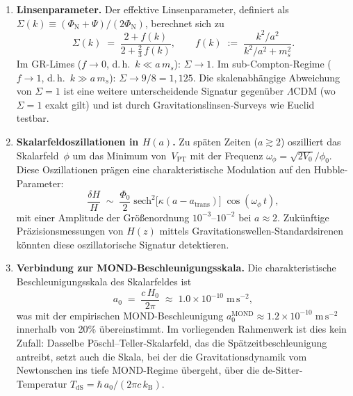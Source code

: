 \documentclass[12pt,a4paper]{article}
\theoremstyle{definition}
\theoremstyle{plain}
\theoremstyle{remark}
\begin{document}
\begin{enumerate}
  \item \textbf{Linsenparameter.}\;
        Der effektive Linsenparameter, definiert als
        $\Sigma(k) \equiv (\Phi_{\mathrm{N}} + \Psi)/
        (2\Phi_{\mathrm{N}})$, berechnet sich zu
        \begin{equation}\label{eq:Sigma}
          \Sigma(k) \;=\;
          \frac{2 + f(k)}{2 + \tfrac{2}{3}\,f(k)},
          \qquad
          f(k) \;:=\;
          \frac{k^{2}/a^{2}}{k^{2}/a^{2} + m_{s}^{2}}.
        \end{equation}
        Im GR-Limes ($f \to 0$, d.\,h.\ $k \ll a\,m_s$):
        $\Sigma \to 1$.  Im sub-Compton-Regime ($f \to 1$, d.\,h.\
        $k \gg a\,m_s$): $\Sigma \to 9/8 = 1{,}125$.  Die
        skalenabh\"angige Abweichung von $\Sigma = 1$ ist eine
        weitere unterscheidende Signatur gegen\"uber $\Lambda$CDM
        (wo $\Sigma = 1$ exakt gilt) und ist durch
        Gravitationslinsen-Surveys wie
        Euclid~\cite{SotiriouFaraoni2010} testbar.

  \item \textbf{Skalarfeldoszillationen in $H(a)$.}\;
        Zu sp\"aten Zeiten ($a \gtrsim 2$) oszilliert das
        Skalarfeld~$\phi$ um das Minimum von~$V_{\mathrm{PT}}$ mit
        der Frequenz $\omega_{\phi} = \sqrt{2V_{0}}/\phi_{0}$. Diese
        Oszillationen pr\"agen eine charakteristische Modulation auf den
        Hubble-Parameter:
        \begin{equation}
          \frac{\delta H}{H}
          \;\sim\; \frac{\Phi_{0}}{2}\;
          \mathrm{sech}^{2}\!\bigl[\kappa(a - a_{\mathrm{trans}})\bigr]\;
          \cos(\omega_{\phi}\,t),
        \end{equation}
        mit einer Amplitude der Gr\"o\ss enordnung
        $10^{-3}$--$10^{-2}$ bei $a \approx 2$. Zuk\"unftige
        Pr\"azisionsmessungen von $H(z)$ mittels
        Gravitationswellen-Standardsirenen k\"onnten diese
        oszillatorische Signatur detektieren.

  \item \textbf{Verbindung zur MOND-Beschleunigungsskala.}\;
        Die charakteristische Beschleunigungsskala des Skalarfeldes ist
        \begin{equation}\label{eq:a0-MOND}
          a_{0} \;=\; \frac{c\,H_{0}}{2\pi}
          \;\approx\; 1.0 \times 10^{-10}\;\mathrm{m\,s^{-2}},
        \end{equation}
        was mit der empirischen MOND-Beschleunigung
        $a_{0}^{\mathrm{MOND}} \approx 1.2 \times
        10^{-10}\;\mathrm{m\,s^{-2}}$ innerhalb von 20\%
        \"ubereinstimmt. Im vorliegenden Rahmenwerk ist dies kein
        Zufall: Dasselbe P\"oschl--Teller-Skalarfeld, das die
        Sp\"atzeitbeschleunigung antreibt, setzt auch die Skala, bei
        der die Gravitationsdynamik vom Newtonschen ins tiefe
        MOND-Regime \"ubergeht, \"uber die de-Sitter-Temperatur
        $T_{\mathrm{dS}} = \hbar\,a_{0}/(2\pi c\,k_{\mathrm{B}})$.


\end{enumerate}
\end{document}
